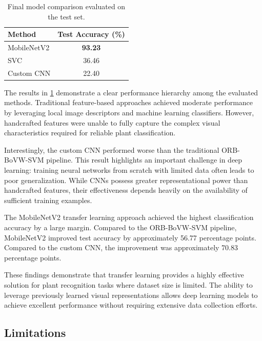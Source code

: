 \begin{table}[t]
\centering
\caption{Final model comparison evaluated on the test set.}
\label{tab:comparison_results}
\begin{tabular}{lc}
\toprule
\textbf{Method} & \textbf{Test Accuracy (\%)} \\
\midrule
MobileNetV2   & \textbf{93.23} \\
SVC  & 36.46 \\
Custom CNN    & 22.40 \\
\bottomrule
\end{tabular}
\end{table}

The results in \cref{tab:comparison_results} demonstrate a clear performance hierarchy among the evaluated methods. Traditional feature-based approaches achieved moderate performance by leveraging local image descriptors and machine learning classifiers. However, handcrafted features were unable to fully capture the complex visual characteristics required for reliable plant classification.

Interestingly, the custom CNN performed worse than the traditional ORB-BoVW-SVM pipeline. This result highlights an important challenge in deep learning: training neural networks from scratch with limited data often leads to poor generalization. While CNNs possess greater representational power than handcrafted features, their effectiveness depends heavily on the availability of sufficient training examples.

The MobileNetV2 transfer learning approach achieved the highest classification accuracy by a large margin. Compared to the ORB-BoVW-SVM pipeline, MobileNetV2 improved test accuracy by approximately 56.77 percentage points. Compared to the custom CNN, the improvement was approximately 70.83 percentage points.

These findings demonstrate that transfer learning provides a highly effective solution for plant recognition tasks where dataset size is limited. The ability to leverage previously learned visual representations allows deep learning models to achieve excellent performance without requiring extensive data collection efforts.



\subsection{Limitations}

